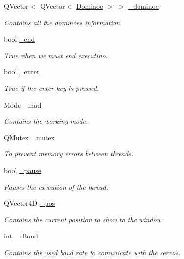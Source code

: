 \begin{DoxyCompactItemize}
Q\+Vector$<$ Q\+Vector$<$ \hyperlink{a00002}{Dominoe} $>$ $>$ \hyperlink{a00009_ad06a87d9f22914fd2597c939a3eb61cd}{\+\_\+dominoe}
\begin{DoxyCompactList}\small\item\em Contains all the dominoes information. \end{DoxyCompactList}\item 
bool \hyperlink{a00009_acca9896d1a2d1ef68527e6834f81c76c}{\+\_\+end}
\begin{DoxyCompactList}\small\item\em True when we must end executino. \end{DoxyCompactList}\item 
bool \hyperlink{a00009_a5a3c1e2c09b76890790458b9d0469714}{\+\_\+enter}
\begin{DoxyCompactList}\small\item\em True if the enter key is pressed. \end{DoxyCompactList}\item 
\hyperlink{a00009_a8d581034e60792a9995d44065f6140a5}{Mode} \hyperlink{a00009_acdecea1688594d3ab7386a6db97dd90d}{\+\_\+mod}
\begin{DoxyCompactList}\small\item\em Contains the working mode. \end{DoxyCompactList}\item 
Q\+Mutex \hyperlink{a00009_a6327eafc0dac189ec1b202d63ef32457}{\+\_\+mutex}
\begin{DoxyCompactList}\small\item\em To prevent memory errors between threads. \end{DoxyCompactList}\item 
bool \hyperlink{a00009_aaf2ef80e8e43518b75d20a5102970d2e}{\+\_\+pause}
\begin{DoxyCompactList}\small\item\em Pauses the execution of the thread. \end{DoxyCompactList}\item 
Q\+Vector4\+D \hyperlink{a00009_a6ad7cef9e9ac7454399871260e3693d4}{\+\_\+pos}
\begin{DoxyCompactList}\small\item\em Contains the current position to show to the window. \end{DoxyCompactList}\item 
int \hyperlink{a00009_a5b9a41b9e271275b914affb0a845a2ee}{\+\_\+s\+Baud}
\begin{DoxyCompactList}\small\item\em Contains the used baud rate to comunicate with the servos. \end{DoxyCompactList}\item 

\end{DoxyCompactItemize}
